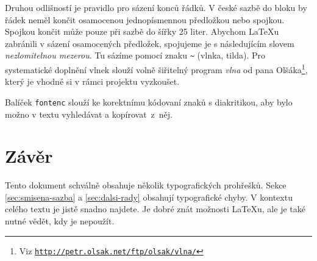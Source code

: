 \documentclass[10pt,a4paper,twocolumn, hidelinks]{article}
\begin{document}
Druhou odlišností je pravidlo pro sázení konců řádků.
V české sazbě do bloku by řádek neměl končit osamocenou jednopísmennou předložkou nebo spojkou.
Spojkou  končit může pouze při sazbě do šířky 25 liter.
Abychom \LaTeX u zabránili v sázení osamocených předložek, spojujeme je s následujícím slovem \textit{nezlomitelnou mezerou}.
Tu sázíme pomocí znaku \verb|~| (vlnka, tilda).
Pro systematické doplnění vlnek slouží volně šiřitelný program \textit{vlna} od pana Olšáka\footnote{Viz \texttt{\href{http://petr.olsak.net/ftp/olsak/vlna/}{http://petr.olsak.net/ftp/olsak/vlna/}}}, který je vhodné si v rámci projektu vyzkoušet.

Balíček \texttt{fontenc} slouží ke korektnímu kódovaní znaků s diakritikou, aby bylo možno v textu vyhledávat a kopí\-rovat~z~něj.

\section{Závěr}
Tento dokument schválně obsahuje několik typografických prohřešků. Sekce \ref{sec:smisena-sazba} a \ref{sec:dalsi-rady} obsahují typografické chyby. V kontextu celého textu je jistě snadno najdete.
Je dobré znát možnosti \LaTeX u, ale je také nutné vědět, kdy je nepoužít.
\end{document}
